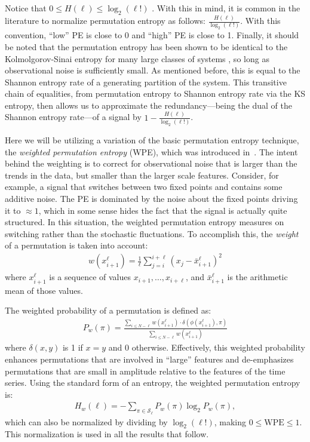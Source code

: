 Notice that $0\le H(\ell) \le \log_2(\ell!)$ \cite{bandt2002per}.
With this in mind, it is common in the literature to normalize
permutation entropy as follows: $\frac{H(\ell)}{\log_2(\ell!)}$.  With
this convention, ``low'' PE is close to 0 and ``high'' PE is close to
1. Finally, it should be noted that the permutation entropy has been
shown to be identical to the Kolmolgorov-Sinai entropy for many large
classes of systems \cite{amigo2012permutation}, so long as
observational noise is sufficiently small. As mentioned before, this
is equal to the Shannon entropy rate of a generating partition of the
system. This transitive chain of equalities, from permutation entropy
to Shannon entropy rate via the KS entropy, then allows us to
approximate the redundancy---being the dual of the Shannon entropy
rate---of a signal by $1 - \frac{H(\ell)}{\log_2(\ell!)}$.

Here we will be utilizing a variation of the basic permutation entropy
technique, the \emph{weighted permutation entropy} (WPE), which was
introduced in~\cite{fadlallah2013}.  The intent behind the weighting
is to correct for observational noise that is larger than the trends
in the data, but smaller than the larger scale features.  Consider,
for example, a signal that switches between two fixed points and
contains some additive noise. The PE is dominated by the noise about
the fixed points driving it to $\approx 1$, which in some sense hides
the fact that the signal is actually quite structured.  In this
situation, the weighted permutation entropy measures on switching
rather than the stochastic fluctuations. To accomplish this, the
\emph{weight} of a permutation is taken into account:
\begin{align*}
  w(x_{i+1}^\ell) = \frac{1}{\ell} \sum_{j = i}^{i+\ell}
                      \left( x_j - \bar{x}_{i+1}^\ell \right)^2
\end{align*}
where $x_{i+1}^\ell$ is a sequence of values $x_{i+1}, \ldots,
x_{i+\ell}$, and $\bar{x}_{i+1}^\ell$ is the arithmetic mean of
those values.

The weighted probability of a permutation is defined as:
\begin{align*}
  P_w(\pi) = \frac{\displaystyle \sum_{i \le N - \ell} w(x_{i+1}^\ell) \cdot \delta(\phi(x_{i+1}^\ell), \pi) }{\displaystyle \sum_{i \le N - \ell} w(x_{i+1}^\ell)}
\end{align*}
where $\delta(x, y)$ is 1 if $x = y$ and 0 otherwise. Effectively,
this weighted probability enhances permutations that are involved in
``large'' features and de-emphasizes permutations that are small in
amplitude relative to the features of the time series. Using the
standard form of an entropy, the weighted permutation entropy is:
\begin{align*}
  H_w(\ell) = - \sum_{\pi \in \mathcal{S}_\ell} P_w(\pi) \log_2 P_w(\pi),
\end{align*}
which can also be normalized by dividing by $\log_2(\ell!)$, making $0
\le \textrm{WPE} \le 1$.  This normalization is used in all the
results that follow.

